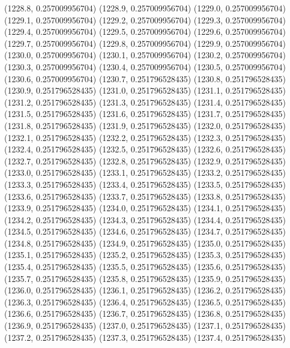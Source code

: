{					(1228.8, 0.257009956704)
					(1228.9, 0.257009956704)
					(1229.0, 0.257009956704)
					(1229.1, 0.257009956704)
					(1229.2, 0.257009956704)
					(1229.3, 0.257009956704)
					(1229.4, 0.257009956704)
					(1229.5, 0.257009956704)
					(1229.6, 0.257009956704)
					(1229.7, 0.257009956704)
					(1229.8, 0.257009956704)
					(1229.9, 0.257009956704)
					(1230.0, 0.257009956704)
					(1230.1, 0.257009956704)
					(1230.2, 0.257009956704)
					(1230.3, 0.257009956704)
					(1230.4, 0.257009956704)
					(1230.5, 0.257009956704)
					(1230.6, 0.257009956704)
					(1230.7, 0.251796528435)
					(1230.8, 0.251796528435)
					(1230.9, 0.251796528435)
					(1231.0, 0.251796528435)
					(1231.1, 0.251796528435)
					(1231.2, 0.251796528435)
					(1231.3, 0.251796528435)
					(1231.4, 0.251796528435)
					(1231.5, 0.251796528435)
					(1231.6, 0.251796528435)
					(1231.7, 0.251796528435)
					(1231.8, 0.251796528435)
					(1231.9, 0.251796528435)
					(1232.0, 0.251796528435)
					(1232.1, 0.251796528435)
					(1232.2, 0.251796528435)
					(1232.3, 0.251796528435)
					(1232.4, 0.251796528435)
					(1232.5, 0.251796528435)
					(1232.6, 0.251796528435)
					(1232.7, 0.251796528435)
					(1232.8, 0.251796528435)
					(1232.9, 0.251796528435)
					(1233.0, 0.251796528435)
					(1233.1, 0.251796528435)
					(1233.2, 0.251796528435)
					(1233.3, 0.251796528435)
					(1233.4, 0.251796528435)
					(1233.5, 0.251796528435)
					(1233.6, 0.251796528435)
					(1233.7, 0.251796528435)
					(1233.8, 0.251796528435)
					(1233.9, 0.251796528435)
					(1234.0, 0.251796528435)
					(1234.1, 0.251796528435)
					(1234.2, 0.251796528435)
					(1234.3, 0.251796528435)
					(1234.4, 0.251796528435)
					(1234.5, 0.251796528435)
					(1234.6, 0.251796528435)
					(1234.7, 0.251796528435)
					(1234.8, 0.251796528435)
					(1234.9, 0.251796528435)
					(1235.0, 0.251796528435)
					(1235.1, 0.251796528435)
					(1235.2, 0.251796528435)
					(1235.3, 0.251796528435)
					(1235.4, 0.251796528435)
					(1235.5, 0.251796528435)
					(1235.6, 0.251796528435)
					(1235.7, 0.251796528435)
					(1235.8, 0.251796528435)
					(1235.9, 0.251796528435)
					(1236.0, 0.251796528435)
					(1236.1, 0.251796528435)
					(1236.2, 0.251796528435)
					(1236.3, 0.251796528435)
					(1236.4, 0.251796528435)
					(1236.5, 0.251796528435)
					(1236.6, 0.251796528435)
					(1236.7, 0.251796528435)
					(1236.8, 0.251796528435)
					(1236.9, 0.251796528435)
					(1237.0, 0.251796528435)
					(1237.1, 0.251796528435)
					(1237.2, 0.251796528435)
					(1237.3, 0.251796528435)
					(1237.4, 0.251796528435)
}
